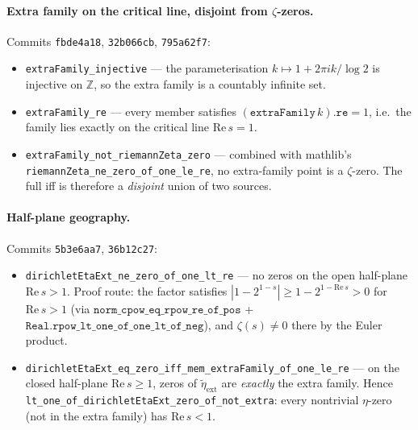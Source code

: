 \paragraph{Extra family on the critical line, disjoint from $\zeta$-zeros.}
Commits \texttt{fbde4a18}, \texttt{32b066cb}, \texttt{795a62f7}:
\begin{itemize}
\item \texttt{extraFamily\_injective} --- the parameterisation
  $k \mapsto 1 + 2\pi i k / \log 2$ is injective on $\mathbb{Z}$, so
  the extra family is a countably infinite set.
\item \texttt{extraFamily\_re} --- every member satisfies
  $(\mathtt{extraFamily}\,k).\mathtt{re} = 1$, i.e.\ the family
  lies exactly on the critical line $\mathrm{Re}\,s = 1$.
\item \texttt{extraFamily\_not\_riemannZeta\_zero} --- combined with
  mathlib's \texttt{riemannZeta\_ne\_zero\_of\_one\_le\_re}, no
  extra-family point is a $\zeta$-zero.  The full iff is therefore
  a \emph{disjoint} union of two sources.
\end{itemize}

\paragraph{Half-plane geography.}
Commits \texttt{5b3e6aa7}, \texttt{36b12c27}:
\begin{itemize}
\item \texttt{dirichletEtaExt\_ne\_zero\_of\_one\_lt\_re} --- no
  zeros on the open half-plane $\mathrm{Re}\,s > 1$.  Proof route:
  the factor satisfies $|1 - 2^{1-s}| \ge 1 - 2^{1 - \mathrm{Re}\,s}
  > 0$ for $\mathrm{Re}\,s > 1$ (via
  $\mathtt{norm\_cpow\_eq\_rpow\_re\_of\_pos}$ +
  $\mathtt{Real.rpow\_lt\_one\_of\_one\_lt\_of\_neg}$), and
  $\zeta(s) \ne 0$ there by the Euler product.
\item \texttt{dirichletEtaExt\_eq\_zero\_iff\_mem\_extraFamily\_of\_one\_le\_re}
  --- on the closed half-plane $\mathrm{Re}\,s \ge 1$, zeros of
  $\widetilde{\eta}_{\mathrm{ext}}$ are \emph{exactly} the extra
  family.  Hence \texttt{lt\_one\_of\_dirichletEtaExt\_zero\_of\_not\_extra}:
  every nontrivial $\eta$-zero (not in the extra family) has
  $\mathrm{Re}\,s < 1$.
\end{itemize}

